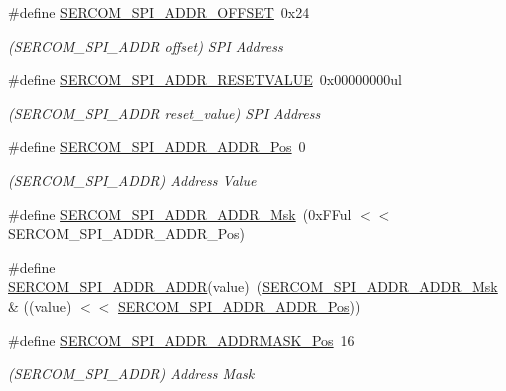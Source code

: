 \begin{DoxyCompactItemize}
\#define \mbox{\hyperlink{group___s_a_m_d21___s_e_r_c_o_m_ga29d57037538f28c61eda89d88408418a}{S\+E\+R\+C\+O\+M\+\_\+\+S\+P\+I\+\_\+\+A\+D\+D\+R\+\_\+\+O\+F\+F\+S\+ET}}~0x24
\begin{DoxyCompactList}\small\item\em (S\+E\+R\+C\+O\+M\+\_\+\+S\+P\+I\+\_\+\+A\+D\+DR offset) S\+PI Address \end{DoxyCompactList}\item 
\#define \mbox{\hyperlink{group___s_a_m_d21___s_e_r_c_o_m_gabd68285f221c7ec348c0a8bc49148677}{S\+E\+R\+C\+O\+M\+\_\+\+S\+P\+I\+\_\+\+A\+D\+D\+R\+\_\+\+R\+E\+S\+E\+T\+V\+A\+L\+UE}}~0x00000000ul
\begin{DoxyCompactList}\small\item\em (S\+E\+R\+C\+O\+M\+\_\+\+S\+P\+I\+\_\+\+A\+D\+DR reset\+\_\+value) S\+PI Address \end{DoxyCompactList}\item 
\#define \mbox{\hyperlink{group___s_a_m_d21___s_e_r_c_o_m_ga97f1119d4ede94d57a763a3118a8bbd0}{S\+E\+R\+C\+O\+M\+\_\+\+S\+P\+I\+\_\+\+A\+D\+D\+R\+\_\+\+A\+D\+D\+R\+\_\+\+Pos}}~0
\begin{DoxyCompactList}\small\item\em (S\+E\+R\+C\+O\+M\+\_\+\+S\+P\+I\+\_\+\+A\+D\+DR) Address Value \end{DoxyCompactList}\item 
\#define \mbox{\hyperlink{group___s_a_m_d21___s_e_r_c_o_m_ga9e0243eaf75a6e0142b1223e669dd7a4}{S\+E\+R\+C\+O\+M\+\_\+\+S\+P\+I\+\_\+\+A\+D\+D\+R\+\_\+\+A\+D\+D\+R\+\_\+\+Msk}}~(0x\+F\+Ful $<$$<$ S\+E\+R\+C\+O\+M\+\_\+\+S\+P\+I\+\_\+\+A\+D\+D\+R\+\_\+\+A\+D\+D\+R\+\_\+\+Pos)
\item 
\#define \mbox{\hyperlink{group___s_a_m_d21___s_e_r_c_o_m_ga5ae8ab06c2d67189cdddd5e66b6698e6}{S\+E\+R\+C\+O\+M\+\_\+\+S\+P\+I\+\_\+\+A\+D\+D\+R\+\_\+\+A\+D\+DR}}(value)~(\mbox{\hyperlink{group___s_a_m_d21___s_e_r_c_o_m_ga9e0243eaf75a6e0142b1223e669dd7a4}{S\+E\+R\+C\+O\+M\+\_\+\+S\+P\+I\+\_\+\+A\+D\+D\+R\+\_\+\+A\+D\+D\+R\+\_\+\+Msk}} \& ((value) $<$$<$ \mbox{\hyperlink{group___s_a_m_d21___s_e_r_c_o_m_ga97f1119d4ede94d57a763a3118a8bbd0}{S\+E\+R\+C\+O\+M\+\_\+\+S\+P\+I\+\_\+\+A\+D\+D\+R\+\_\+\+A\+D\+D\+R\+\_\+\+Pos}}))
\item 
\#define \mbox{\hyperlink{group___s_a_m_d21___s_e_r_c_o_m_ga6d47ea34d101ac15d965c5679ab4ecae}{S\+E\+R\+C\+O\+M\+\_\+\+S\+P\+I\+\_\+\+A\+D\+D\+R\+\_\+\+A\+D\+D\+R\+M\+A\+S\+K\+\_\+\+Pos}}~16
\begin{DoxyCompactList}\small\item\em (S\+E\+R\+C\+O\+M\+\_\+\+S\+P\+I\+\_\+\+A\+D\+DR) Address Mask \end{DoxyCompactList}\item 

\end{DoxyCompactItemize}

